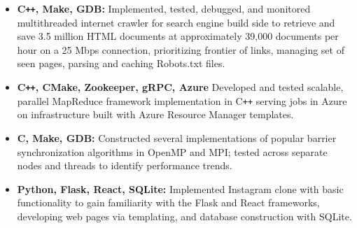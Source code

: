 \documentclass[overlapped]{res}
\begin{document}
\begin{resume}
\begin{itemize}[label={}]  \itemsep -2pt %
    \item \textbf{C\texttt{++}, Make, GDB:}
        Implemented, tested, debugged, and monitored multithreaded internet crawler
        for search engine build side to retrieve and save 3.5 million HTML documents
        at approximately 39,000 documents per hour on a 25 Mbps connection,
        prioritizing frontier of links, managing set of seen pages, parsing and caching Robots.txt files.
    \item \textbf{C\texttt{++}, CMake, Zookeeper, gRPC, Azure}
        Developed and tested scalable, parallel MapReduce framework implementation in C\texttt{++}
        serving jobs in Azure on infrastructure built with Azure Resource Manager templates.
    \item \textbf{C, Make, GDB:}
        Constructed several implementations of popular barrier synchronization
        algorithms in OpenMP and MPI; tested across separate nodes and threads to identify
        performance trends.
    \item \textbf{Python, Flask, React, SQLite:}
        Implemented Instagram clone with basic functionality 
        to gain familiarity with the Flask and React frameworks, 
        developing web pages via templating, 
        and database construction with SQLite.

\end{itemize}
\end{resume}
\end{document}
